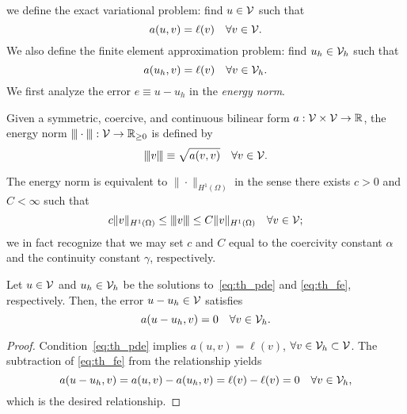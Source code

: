 we define the exact variational problem: find $u \in \mathcal{V}$ such that
\begin{equation}
  a(u,v) = \ell(v) \quad \forall v \in \mathcal{V}. \label{eq:th_pde}
\end{equation}
We also define the finite element approximation problem: find $u_h \in \mathcal{V}_h$ such that
\begin{equation}
  a(u_h,v) = \ell(v) \quad \forall v \in \mathcal{V}_h. \label{eq:th_fe}
\end{equation}
We first analyze the error $e \equiv u - u_h$ in the \emph{energy norm}. 
\begin{definition}
  Given a symmetric, coercive, and continuous bilinear form $a: \mathcal{V} \times \mathcal{V} \to \mathbb{R}$, the energy norm $|\kern-1pt|\kern-1pt| \cdot |\kern-1pt|\kern-1pt| : \mathcal{V} \to \mathbb{R}_{\geq 0}$ is defined by
  \begin{equation*}
    |\kern-1pt|\kern-1pt| v |\kern-1pt|\kern-1pt| \equiv \sqrt{a(v,v)} \quad \forall v \in \mathcal{V}.
  \end{equation*}
\end{definition}
The energy norm is equivalent to $\| \cdot \|_{H^1(\Omega)}$ in the sense there exists $c > 0$ and $C < \infty$ such that
\begin{equation*}
  c \| v \|_{H^1(\Omega)} \leq |\kern-1pt|\kern-1pt| v |\kern-1pt|\kern-1pt| \leq C \| v \|_{H^1(\Omega)} \quad \forall v \in \mathcal{V};
\end{equation*}
we in fact recognize that we may set $c$ and $C$ equal to the coercivity constant $\alpha$ and the continuity constant $\gamma$, respectively.

\begin{lemma}
  Let $u \in \mathcal{V}$ and $u_h \in \mathcal{V}_h$ be the solutions to~\eqref{eq:th_pde} and \eqref{eq:th_fe}, respectively.  Then, the error $u - u_h \in \mathcal{V}$ satisfies 
  \begin{equation*}
    a(u - u_h, v) = 0 \quad \forall v \in \mathcal{V}_h.
  \end{equation*}
  \begin{proof}
    Condition~\eqref{eq:th_pde} implies $a(u,v) = \ell(v)$, $\forall v \in \mathcal{V}_h \subset \mathcal{V}$.  The subtraction of \eqref{eq:th_fe} from the relationship yields
    \begin{equation*}
      a(u - u_h, v) = a(u,v) - a(u_h,v) = \ell(v) - \ell(v) = 0 \quad \forall v \in \mathcal{V}_h,
    \end{equation*}
    which is the desired relationship.
  \end{proof}
\end{lemma}

